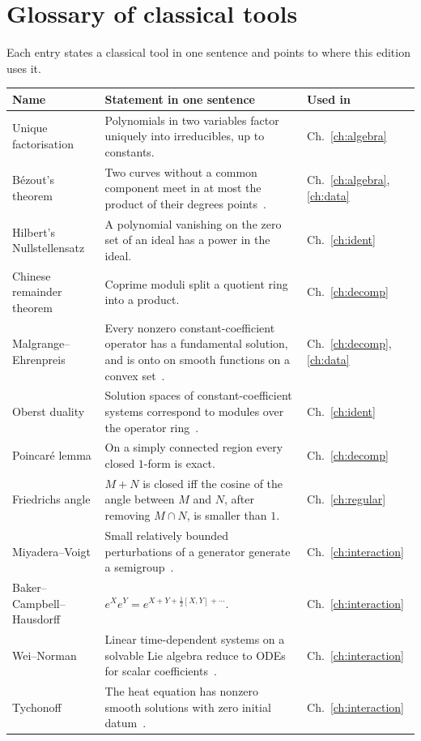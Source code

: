 \section{Glossary of classical tools}\label{app:gloss}

Each entry states a classical tool in one sentence and points to where this edition uses it.

\begin{center}\small
\begin{longtable}{@{}L{3.5cm}L{8.6cm}L{2.2cm}@{}}
\toprule
Name & Statement in one sentence & Used in\\\midrule\endhead
Unique factorisation & Polynomials in two variables factor uniquely into irreducibles, up to constants. & Ch.~\ref{ch:algebra}\\
B\'ezout's theorem & Two curves without a common component meet in at most the product of their degrees points~\cite{fu}. & Ch.~\ref{ch:algebra}, \ref{ch:data}\\
Hilbert's Nullstellensatz & A polynomial vanishing on the zero set of an ideal has a power in the ideal. & Ch.~\ref{ch:ident}\\
Chinese remainder theorem & Coprime moduli split a quotient ring into a product. & Ch.~\ref{ch:decomp}\\
Malgrange--Ehrenpreis & Every nonzero constant-coefficient operator has a fundamental solution, and is onto on smooth functions on a convex set~\cite{eh,ma}. & Ch.~\ref{ch:decomp}, \ref{ch:data}\\
Oberst duality & Solution spaces of constant-coefficient systems correspond to modules over the operator ring~\cite{ob}. & Ch.~\ref{ch:ident}\\
Poincar\'e lemma & On a simply connected region every closed $1$-form is exact. & Ch.~\ref{ch:decomp}\\
Friedrichs angle & $M+N$ is closed iff the cosine of the angle between $M$ and $N$, after removing $M\cap N$, is smaller than $1$. & Ch.~\ref{ch:regular}\\
Miyadera--Voigt & Small relatively bounded perturbations of a generator generate a semigroup~\cite{en}. & Ch.~\ref{ch:interaction}\\
Baker--Campbell--Hausdorff & $e^Xe^Y=e^{X+Y+\frac12[X,Y]+\cdots}$. & Ch.~\ref{ch:interaction}\\
Wei--Norman & Linear time-dependent systems on a solvable Lie algebra reduce to ODEs for scalar coefficients~\cite{wn}. & Ch.~\ref{ch:interaction}\\
Tychonoff & The heat equation has nonzero smooth solutions with zero initial datum~\cite{fj}. & Ch.~\ref{ch:interaction}\\

\end{longtable}
\end{center}
